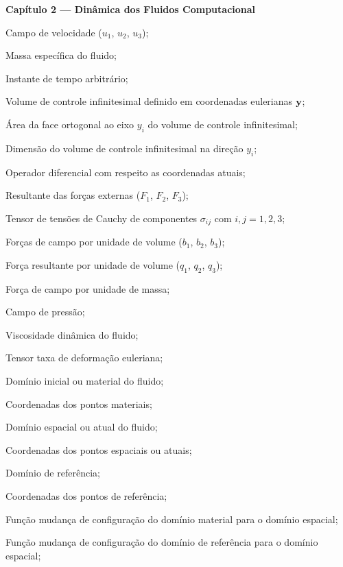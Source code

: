 \begin{simbolos}	
 \item[]\textbf{Capítulo 2 — Dinâmica dos Fluidos Computacional}
\item[$\velocity$] Campo de velocidade ($u_1$, $u_2$, $u_3$);
\item[$\density$] Massa específica do fluido;
\item[$\tempo$] Instante de tempo arbitrário;
\item[$dV$] Volume de controle infinitesimal definido em coordenadas eulerianas $\pos$;
\item[$dA_i$] Área da face ortogonal ao eixo $y_i$ do volume de controle infinitesimal;
\item[$dy_i$] Dimensão do volume de controle infinitesimal na direção $y_i$;
\item[$\boldsymbol{\nabla}_y$] Operador diferencial com respeito as coordenadas atuais;
\item [$\mathbf{F}$] Resultante das forças externas ($F_1$, $F_2$, $F_3$);
\item[$\stressTensor$] Tensor de tensões de Cauchy de componentes $\sigma_{ij}$ com $i,j = 1,2,3$;
\item[$\mathbf{b}$] Forças de campo por unidade de volume ($b_1$, $b_2$, $b_3$);
\item[$\mathbf{q}$] Força resultante por unidade de volume ($q_1$, $q_2$, $q_3$);
\item[$\sbodyforce$] Força de campo por unidade de massa;
\item[$\press$] Campo de pressão;
\item[$\viscosity$] Viscosidade dinâmica do fluido;
\item[$\straintensor(\bullet)$] Tensor taxa de deformação euleriana;
\item[$\domainMat$] Domínio inicial ou material do fluido;
\item[$\posMat$] Coordenadas dos pontos materiais; 
\item[$\domain$] Domínio espacial ou atual do fluido;
\item[$\pos$] Coordenadas dos pontos espaciais ou atuais;
\item[$\domainRef$] Domínio de referência;
\item[$\posALE$] Coordenadas dos pontos de referência;
 \item[$\fmapAI(\posMat,t)$] Função mudança de configuração do domínio material para o domínio espacial;
\item[$\fmapAR(\posALE,t)$] Função mudança de configuração do domínio de referência para o domínio espacial;

\end{simbolos}
